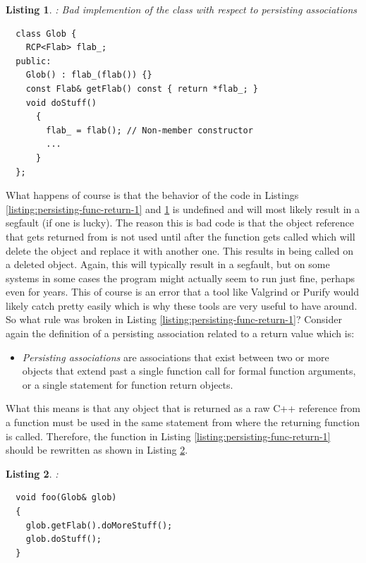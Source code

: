 \documentclass[pdf,ps2pdf,11pt]{SANDreport}
\newtheorem{listing}{Listing}
\begin{document}
{}\begin{listing}: Bad implemention of the {} class with
respect to persisting associations
\label{listing:bad-Glob-non-persisting}
{\small\begin{verbatim}
  class Glob {
    RCP<Flab> flab_;
  public:
    Glob() : flab_(flab()) {}
    const Flab& getFlab() const { return *flab_; }
    void doStuff()
      {
        flab_ = flab(); // Non-member constructor
        ...
      }
  };
\end{verbatim}}
\end{listing}


What happens of course is that the behavior of the code in Listings
{}\ref{listing:persisting-func-return-1} and
{}\ref{listing:bad-Glob-non-persisting} is undefined and will most
likely result in a segfault (if one is lucky).  The reason this is bad
code is that the {} object reference that gets returned from
{} is not used until after the function
{} gets called which will delete the {}
object and replace it with another one.  This results in
{} being called on a deleted object.  Again,
this will typically result in a segfault, but on some systems in some
cases the program might actually seem to run just fine, perhaps even
for years.  This of course is an error that a tool like Valgrind or
Purify would likely catch pretty easily which is why these tools are
very useful to have around.  So what rule was broken in Listing
{}\ref{listing:persisting-func-return-1}?  Consider again the
definition of a persisting association related to a return value which
is:

\begin{itemize}

{}\item\textit{Persisting associations} are associations that exist
between two or more objects that extend past a single function call
for formal function arguments, or a single statement for function
return objects.

\end{itemize}

What this means is that any object that is returned as a raw C++
reference from a function must be used in the same statement from
where the returning function is called.  Therefore, the function in
Listing {}\ref{listing:persisting-func-return-1} should be rewritten
as shown in Listing {}\ref{listing:non-persisting-func-return-1}.


\begin{listing}:\\
\label{listing:non-persisting-func-return-1}
{\small\begin{verbatim}
  void foo(Glob& glob)
  {
    glob.getFlab().doMoreStuff();
    glob.doStuff();
  }
\end{verbatim}}
\end{listing}
\end{document}

